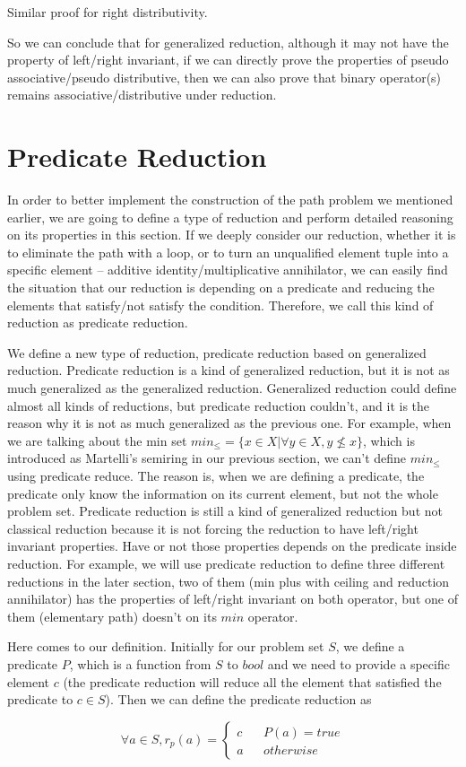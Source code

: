 \documentclass[a4paper,12pt,twoside,openright]{report}
\newcommand{\e}[2]{
\begin{equation}
  \label{#1} 
  #2
\end{equation}
}
\begin{document}
Similar proof for right distributivity. 

So we can conclude that for generalized reduction, although it may not have the property of left/right invariant, if we can directly prove the properties of pseudo associative/pseudo distributive, then we can also prove that binary operator(s) remains associative/distributive under reduction.

\section{Predicate Reduction}
In order to better implement the construction of the path problem we mentioned earlier, we are going to define a type of reduction and perform detailed reasoning on its properties in this section. 
If we deeply consider our reduction, whether it is to eliminate the path with a loop, or to turn an unqualified element tuple into a specific element -- additive identity/multiplicative annihilator, we can easily find the situation that our reduction is depending on a predicate and reducing the elements that satisfy/not satisfy the condition. Therefore, we call this kind of reduction as predicate reduction.

We define a new type of reduction, predicate reduction based on generalized reduction. 
Predicate reduction is a kind of generalized reduction, but it is not as much generalized as the generalized reduction. Generalized reduction could define almost all kinds of reductions, but predicate reduction couldn't, and it is the reason why it is not as much generalized as the previous one. For example, when we are talking about the min set $min_\leq = \{ x \in X | \forall y \in X, y \not\leq x \}$, which is introduced as Martelli’s semiring in our previous section, we can't define $min_\leq$ using predicate reduce. The reason is, when we are defining a predicate, the predicate only know the information on its current element, but not the whole problem set. Predicate reduction is still a kind of generalized reduction but not classical reduction because it is not forcing the reduction to have left/right invariant properties. Have or not those properties depends on the predicate inside reduction. For example, we will use predicate reduction to define three different reductions in the later section, two of them (min plus with ceiling and reduction annihilator) has the properties of left/right invariant on both operator, but one of them (elementary path) doesn't on its $min$ operator.

Here comes to our definition. Initially for our problem set $S$, we define a predicate $P$, which is a function from $S$ to $bool$ and we need to provide a specific element $c$ (the predicate reduction will reduce all the element that satisfied the predicate to $c \in S$). Then we can define the predicate reduction as 
\e{pr:def:def}{\forall a \in S,  r_p(a)=\left\{
\begin{aligned}
c &  & P(a) = true \\
a &  & otherwise 
\end{aligned}
\right.}
\end{document}
